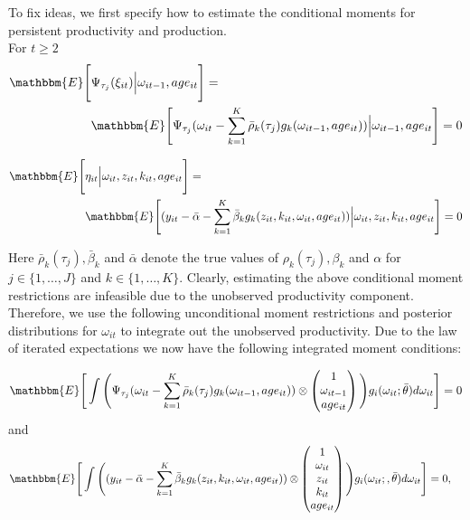 \documentclass{article}
\begin{document}
To fix ideas, we first specify how to estimate the conditional moments for persistent productivity and production.\\

\noindent For $t\geq 2$
\begin{equation}\label{omegamoment}
\begin{split}
\mathbbm{E}\Bigg[&\Psi_{\tau_{j}}(\xi_{it})\Big|\omega_{it-1}, age_{it}\Bigg]=\\
&\mathbbm{E}\Bigg[\Psi_{\tau_{j}}(\omega_{it}-\sum_{k=1}^{K}\bar{\rho}_{k}(\tau_{j})g_{k}(\omega_{it-1}, age_{it}))\Big|\omega_{it-1}, age_{it}\Bigg]=0
\end{split}
\end{equation}

\begin{equation}\label{ymoment}
\begin{split}
\mathbbm{E}\Bigg[&\eta_{it}\Big|\omega_{it}, z_{it}, k_{it}, age_{it}\Bigg]=\\
&\mathbbm{E}\Bigg[(y_{it}-\bar{\alpha}-\sum_{k=1}^{K}\bar{\beta}_{k}g_{k}(z_{it}, k_{it}, \omega_{it}, age_{it}))\Big|\omega_{it}, z_{it}, k_{it}, age_{it}\Bigg]=0
\end{split}
\end{equation}

Here $\bar{\rho}_{k}(\tau_{j}), \bar{\beta}_{k}$ and $\bar{\alpha}$ denote the true values of $\rho_{k}(\tau_{j}), \beta_{k}$ and $\alpha$ for $j\in\{1,\dots, J\}$ and $k\in\{1,\dots,K\}$. Clearly, estimating the above conditional moment restrictions are infeasible due to the unobserved productivity component. Therefore, we use the following unconditional moment restrictions and posterior distributions for $\omega_{it}$ to integrate out the unobserved productivity. Due to the law of iterated expectations we now have the following integrated moment conditions:

\begin{equation}\label{omegaimc}
\mathbbm{E}\Bigg[\int\Bigg(\Psi_{\tau_{j}}(\omega_{it}-\sum_{k=1}^{K}\bar{\rho}_{k}(\tau_{j})g_{k}(\omega_{it-1}, age_{it}))\otimes
\begin{pmatrix}
1 \\
\omega_{it-1}\\
age_{it}
\end{pmatrix}
\Bigg)g_{i}(\omega_{it};\bar{\theta})d\omega_{it}\Bigg]=0
\end{equation}
and 
\begin{equation}\label{yimc}
\begin{split}
\mathbbm{E}\Bigg[\int\Bigg((y_{it}&-\bar{\alpha}-\sum_{k=1}^{K}\bar{\beta}_{k}g_{k}(z_{it}, k_{it}, \omega_{it},age_{it}))\otimes
\begin{pmatrix}
1 \\
\omega_{it}\\
z_{it}\\
k_{it}\\
age_{it}
\end{pmatrix}
\Bigg)g_{i}(\omega_{it};,\bar{\theta})d\omega_{it}\Bigg]=0,
\end{split}
\end{equation}
\end{document}
